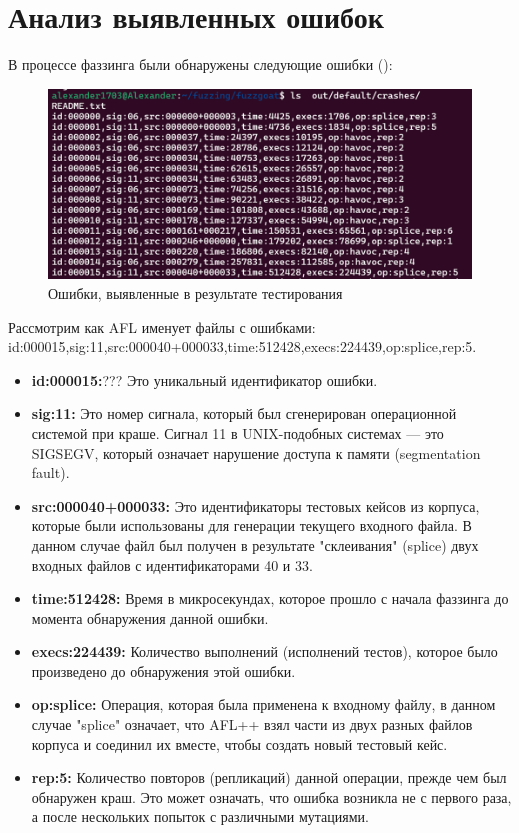 \section{Анализ выявленных ошибок} \label{ch4:sec2}
В процессе фаззинга были обнаружены следующие ошибки ():

\begin{figure}[ht] 
	\center
	\includegraphics [scale=1] {my_folder/images/errors}
	\caption{Ошибки, выявленные в результате тестирования} 
	\label{fig:errors-ch4}  
\end{figure}

Рассмотрим как AFL именует файлы с ошибками:
id:000015,sig:11,src:000040+000033,time:512428,execs:224439,op:splice,rep:5.

\begin{itemize}
	\item \textbf{id:000015:}??? Это уникальный идентификатор ошибки.
	\item \textbf{sig:11:} Это номер сигнала, который был сгенерирован операционной системой при краше. Сигнал 11 в UNIX-подобных системах — это SIGSEGV, который означает нарушение доступа к памяти (segmentation fault).
	\item \textbf{src:000040+000033:} Это идентификаторы тестовых кейсов из корпуса, которые были использованы для генерации текущего входного файла. В данном случае файл был получен в результате "склеивания" (splice) двух входных файлов с идентификаторами 40 и 33.
	\item \textbf{time:512428:} Время в микросекундах, которое прошло с начала фаззинга до момента обнаружения данной ошибки.
	\item \textbf{execs:224439:} Количество выполнений (исполнений тестов), которое было произведено до обнаружения этой ошибки.
	\item \textbf{op:splice:} Операция, которая была применена к входному файлу, в данном случае "splice" означает, что AFL++ взял части из двух разных файлов корпуса и соединил их вместе, чтобы создать новый тестовый кейс.
	\item \textbf{rep:5:} Количество повторов (репликаций) данной операции, прежде чем был обнаружен краш. Это может означать, что ошибка возникла не с первого раза, а после нескольких попыток с различными мутациями.
\end{itemize}

